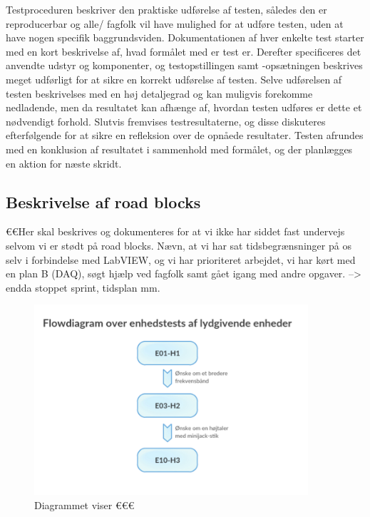 Testproceduren beskriver den praktiske udførelse af testen, således den er reproducerbar og alle/ fagfolk vil have mulighed for at udføre testen, uden at have nogen specifik baggrundsviden. Dokumentationen af hver enkelte test starter med en kort beskrivelse af, hvad formålet med er test er. Derefter specificeres det anvendte udstyr og komponenter, og testopstillingen samt -opsætningen beskrives meget udførligt for at sikre en korrekt udførelse af testen. Selve udførelsen af testen beskrivelses med en høj detaljegrad og kan muligvis forekomme nedladende, men da resultatet kan afhænge af, hvordan testen udføres er dette et nødvendigt forhold. Slutvis fremvises testresultaterne, og disse diskuteres efterfølgende for at sikre en refleksion over de opnåede resultater. Testen afrundes med en konklusion af resultatet i sammenhold med formålet, og der planlægges en aktion for næste skridt.   

\subsection{Beskrivelse af road blocks}

€€Her skal beskrives og dokumenteres for at vi ikke har siddet fast undervejs selvom vi er stødt på road blocks. 
Nævn, at vi har sat tidsbegrænsninger på os selv i forbindelse med LabVIEW, og vi har prioriteret arbejdet, vi har kørt med en plan B (DAQ), søgt hjælp ved fagfolk samt gået igang med andre opgaver. --> endda stoppet sprint, tidsplan mm. 

\begin{figure}[htb]
			\centering
				\includegraphics[width=4in]{flowdiagramelyd}
				\caption{Diagrammet viser €€€}	
				\label{fig:flowdiagramelyd}
			\end{figure}

